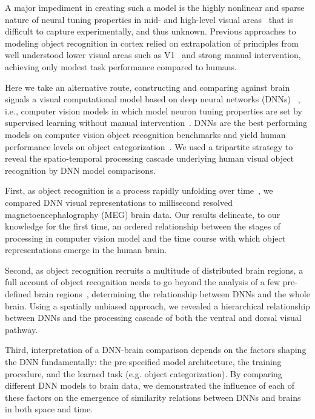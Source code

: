 \documentclass[10pt,twocolumn,letterpaper]{article}
\begin{document}
A major impediment in creating such a model is the highly nonlinear and sparse nature of neural tuning properties in mid- and high-level visual areas~\cite{david2006spectral,wang1996optical,yamane2008neural} that is difficult to capture experimentally, and thus unknown. Previous approaches to modeling object recognition in cortex relied on extrapolation of principles from well understood lower visual areas such as V1~\cite{riesenhuber1999hierarchical,riesenhuber2002neural} and strong manual intervention, achieving only modest task performance compared to humans.

Here we take an alternative route, constructing and comparing against brain signals a visual computational model based on deep neural networks (DNNs)~\cite{lecun2015deep,mnih2015human} , i.e., computer vision models in which model neuron tuning properties are set by supervised learning without manual intervention~\cite{lecun2015deep,rumelhart1988learning}. DNNs are the best performing models on computer vision object recognition benchmarks and yield human performance levels on object categorization~\cite{russakovsky2014imagenet,he2015delving}. We used a tripartite strategy to reveal the spatio-temporal processing cascade underlying human visual object recognition by DNN model comparisons.

First, as object recognition is a process rapidly unfolding over time~\cite{bullier2001integrated,cichy2014resolving,schmolesky1998signal}, we compared DNN visual representations to millisecond resolved magnetoencephalography (MEG) brain data. Our results delineate, to our knowledge for the first time, an ordered relationship between the stages of processing in computer vision model and the time course with which object representations emerge in the human brain.

Second, as object recognition recruits a multitude of distributed brain regions, a full account of object recognition needs to go beyond the analysis of a few pre-defined brain regions~\cite{agrawal2014pixels,cadieu2014deep,gucclu2014deep,khaligh2014deep,yamins2014performance}, determining the relationship between DNNs and the whole brain. Using a spatially unbiased approach, we revealed a hierarchical relationship between DNNs and the processing cascade of both the ventral and dorsal visual pathway.

Third, interpretation of a DNN-brain comparison depends on the factors shaping the DNN fundamentally: the pre-specified model architecture, the training procedure, and the learned task (e.g. object categorization). By comparing different DNN models to brain data, we demonstrated the influence of each of these factors on the emergence of similarity relations between DNNs and brains in both space and time.
\end{document}
